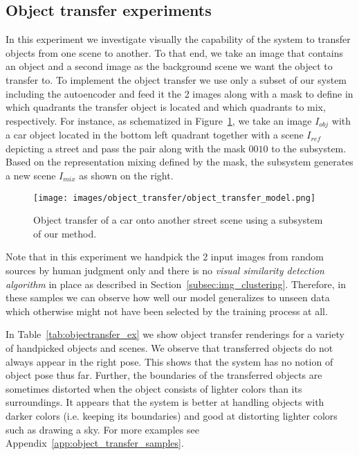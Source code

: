 \documentclass[a4paper,12pt]{report}
\begin{document}
\subsection{Object transfer experiments}\label{subsubsec:objTransfExp}
In this experiment we investigate visually the capability of the system to transfer objects from one scene to another. To that end, we take an image that contains an object and a second image as the background scene we want the object to transfer to. To implement the object transfer we use only a subset of our system including the autoencoder and feed it the 2 images along with a mask to define in which quadrants the transfer object is located and which quadrants to mix, respectively. For instance, as schematized in Figure~\ref{fig:objectransfer_arch}, we take an image $I_{obj}$ with a car object located in the bottom left quadrant together with a scene $I_{ref}$ depicting a street and pass the pair along with the mask $0010$ to the subsystem. Based on the representation mixing defined by the mask, the subsystem generates a new scene $I_{mix}$ as shown on the right.
\begin{figure}[ht]
\centering
\texttt{[image: images/object\_transfer/object\_transfer\_model.png]}
\caption{Object transfer of a car onto another street scene using a subsystem of our method.}
\label{fig:objectransfer_arch}
\end{figure}
Note that in this experiment we handpick the 2 input images from random sources by human judgment only and there is no \textit{visual similarity detection algorithm} in place as described in Section~\ref{subsec:img_clustering}. Therefore, in these samples we can observe how well our model generalizes to unseen data which otherwise might not have been selected by the training process at all.

In Table~\ref{tab:objectransfer_ex} we show object transfer renderings for a variety of handpicked objects and scenes. We observe that transferred objects do not always appear in the right pose. This shows that the system has no notion of object pose thus far. Further, the boundaries of the transferred objects are sometimes distorted when the object consists of lighter colors than its surroundings. It appears that the system is better at handling objects with darker colors (i.e. keeping its boundaries) and good at distorting lighter colors such as drawing a sky. For more examples see Appendix~\ref{app:object_transfer_samples}.

\end{document}
